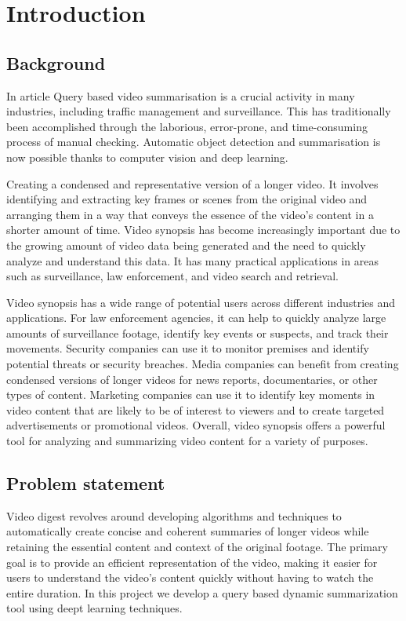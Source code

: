 \documentclass[12pt,a4paper]{report}
\begin{document}


\chapter{Introduction}
\par
\section{Background}
In article \cite{li2024matching} Query based video summarisation is a crucial activity in many industries, including traffic management and surveillance. This has traditionally been accomplished through the laborious, error-prone, and time-consuming process of manual checking. Automatic object detection and summarisation is now possible thanks to computer vision and deep learning.
\par 
Creating a condensed and representative version of a longer video. It involves identifying and extracting key frames or scenes from the original video and arranging them in a way that conveys the essence of the video's content in a shorter amount of time. Video synopsis has become increasingly important due to the growing amount of video data being generated and the need to quickly analyze and understand this data. It has many practical applications in areas such as surveillance, law enforcement, and video search and retrieval.
\par
Video synopsis has a wide range of potential users across different industries and applications. For law enforcement agencies, it can help to quickly analyze large amounts of surveillance footage, identify key events or suspects, and track their movements. Security companies can use it to monitor premises and identify potential threats or security breaches. Media companies can benefit from creating condensed versions of longer videos for news reports, documentaries, or other types of content. Marketing companies can use it to identify key moments in video content that are likely to be of interest to viewers and to create targeted advertisements or promotional videos. Overall, video synopsis offers a powerful tool for analyzing and summarizing video content for a variety of purposes.

\section{Problem statement }
Video digest revolves around developing algorithms and techniques to automatically create concise and coherent summaries of longer videos while retaining the essential content and context of the original footage. The primary goal is to provide an efficient representation of the video, making it easier for users to understand the video's content quickly without having to watch the entire duration. In this project we develop a query based dynamic summarization tool using deept learning techniques. 
\end{document}
